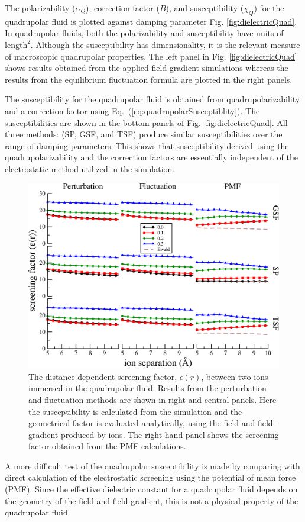 The polarizability ($\alpha_Q$), correction factor ($B$), and
susceptibility ($\chi_Q$) for the quadrupolar fluid is plotted against
damping parameter Fig.  \ref{fig:dielectricQuad}.  In quadrupolar
fluids, both the polarizability and susceptibility have units of
$\mathrm{length}^2$. Although the susceptibility has dimensionality, it
is the relevant measure of macroscopic quadrupolar
properties.\cite{JeonI03, JeonII03} The left panel in
Fig. \ref{fig:dielectricQuad} shows results obtained from the applied
field gradient simulations whereas the results from the equilibrium
fluctuation formula are plotted in the right panels.

The susceptibility for the quadrupolar fluid is obtained from
quadrupolarizability and a correction factor using
Eq.~(\ref{eq:quadrupolarSusceptiblity}).  The susceptibilities are
shown in the bottom panels of Fig. \ref{fig:dielectricQuad}. All three
methods: (SP, GSF, and TSF) produce similar susceptibilities over the
range of damping parameters.  This shows that susceptibility derived
using the quadrupolarizability and the correction factors are
essentially independent of the electrostatic method utilized in the
simulation.

\begin{figure}
\begin{center}
\includegraphics[width=\linewidth]{ScreeningFactor_Quad.pdf}
\caption{\label{fig:screenQuad} The distance-dependent screening
  factor, $\epsilon(r)$, between two ions immersed in the quadrupolar
  fluid. Results from  the perturbation and fluctuation methods are
  shown in right and central panels. Here the susceptibility is
  calculated from the  simulation and the geometrical factor is
  evaluated analytically, using the field and field-gradient produced
  by ions. The right hand panel shows the screening factor obtained
  from the PMF calculations.}
  \end{center}
\end{figure}
A more difficult test of the quadrupolar susceptibility is made by
comparing with direct calculation of the electrostatic screening using
the potential of mean force (PMF). Since the effective dielectric
constant for a quadrupolar fluid depends on the geometry of the field
and field gradient, this is not a physical property of the quadrupolar
fluid. 


